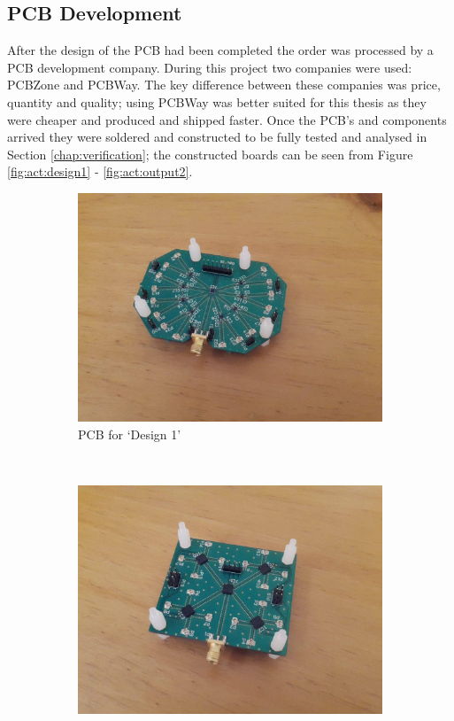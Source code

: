 \documentclass[12pt,openany,a4paper]{book}
\begin{document}
\subsection{PCB Development}
After the design of the PCB had been completed the order was processed by a PCB development company. During this project two companies were used: PCBZone and PCBWay. The key difference between these companies was price, quantity and quality; using PCBWay was better suited for this thesis as they were cheaper and produced and shipped faster. Once the PCB's and components arrived they were soldered and constructed to be fully tested and analysed in Section \ref{chap:verification}; the constructed boards can be seen from Figure \ref{fig:act:design1} - \ref{fig:act:output2}.
\begin{figure}[H]
    \centering
    \begin{subfigure}[t]{0.5\textwidth}
        \centering
        \includegraphics[width=1\textwidth]{pcb-design1.jpg}
        \caption{PCB for `Design 1'}
    \end{subfigure}%
    ~ 
    \begin{subfigure}[t]{0.5\textwidth}
        \centering
        \includegraphics[width=1\textwidth]{pcb-design2.jpg}

\end{subfigure}
\end{figure}
\end{document}
